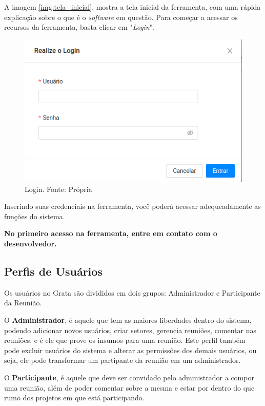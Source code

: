 A imagem \ref{img:tela_inicial}, mostra a tela inicial da ferramenta, com uma rápida explicação sobre o que é o \textit{software} em questão. Para começar a acessar os recursos da ferramenta, basta clicar em "\textit{Login}".

\begin{figure}[H]
    \centering
    \includegraphics[width=1.0\textwidth]{figuras/tela_login.png}
    \caption{Login. Fonte: Própria}
    \label{img:tela_login}
\end{figure}

Inserindo suas credenciais na ferramenta, você poderá acessar adequeadamente as funções do sistema.

\textbf{No primeiro acesso na ferramenta, entre em contato com o desenvolvedor.}

\subsection{Perfis de Usuários}

Os usuários no Grata são divididos em dois grupos: Administrador e Participante da Reunião.

O \textbf{Administrador}, é aquele que tem as maiores liberdades dentro do sistema, podendo adicionar novos usuários, criar setores, gerencia reuniões, comentar nas reuniões, e é ele que prove os insumos para uma reunião. Este perfil também pode excluir usuários do sistema e alterar as permissões dos demais usuários, ou seja, ele pode transformar um partipante da reunião em um administrador.

O \textbf{Participante}, é aquele que deve ser convidado pelo administrador a compor uma reunião, além de poder comentar sobre a mesma e estar por dentro do que rumo dos projetos em que está participando.


